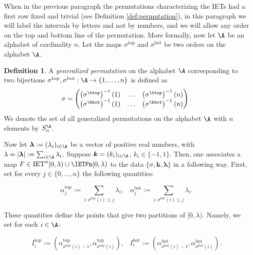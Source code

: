 \documentclass[12pt]{article}
\theoremstyle{definition}
\newtheorem{definition}{Definition}
\begin{document}
When in the previous paragraph the permutations characterizing the IETs had a first row fixed and trivial (see Definition \ref{def:permutation}), in this paragraph we will label the intervals by letters and not by numbers, and we will allow any order on the top and bottom line of the permutation. More formally, now let $\A$ be an alphabet of cardinality $n$. Let the maps $\sigma^{\mathrm{top}}$ and $\sigma^{\mathrm{bot}}$ be two orders on the alphabet $\A$. 

\begin{definition}
A \emph{generalized permutation} on the alphabet $\A$ corresponding to two bijections $\sigma^{\mathrm{top}}, \sigma^{\mathrm{bot}}: \A \rightarrow \{1, \ldots, n\}$ is 
defined as
\begin{equation}\label{eq:matrix_representation_gen_permutation}
\sigma=\begin{pmatrix}
\left(\sigma^{\ttop}\right)^{-1}(1)&\ldots&\left(\sigma^{\ttop}\right)^{-1}(n) \\
\left(\sigma^{\bbot}\right)^{-1}(1)&\ldots&\left(\sigma^{\bbot}\right)^{-1}(n) 
\end{pmatrix}.
\end{equation}
We denote the set of all generalized permutations on the alphabet $\A$ with $n$ elements by $S_n^{\A}$.
\end{definition}

Now let $\boldsymbol{\lambda}:=(\lambda_i)_{i \in \A}$ be a vector of positive real numbers, with $\lambda=|\boldsymbol{\lambda}|:=\sum_{i \in \A} \lambda_i$. Suppose $\boldsymbol{k}=(k_i)_{i \in \A}$, $k_i \in \{-1,1\}$. Then, one associates a map $F \in \mathrm{IET}^n [0, \lambda) \cup \IETFn [0, \lambda) $ to the data $\{\sigma, \textbf{k}, \boldsymbol{\lambda}\}$ in a following way. First, set for every $j \in \{0, \ldots, n\}$ the following quantities:

\begin{equation*}
\alpha_j^{\mathrm{top}}:=\sum_{i: \sigma^{\mathrm{top}}(i) \leq j} \lambda_i, \;\;\; \alpha_j^{\mathrm{bot}}:=\sum_{i: \sigma^{\mathrm{bot}}(i) \leq j} \lambda_i.
\end{equation*}

These quantities define the points that give two partitions of $[0, \lambda)$. Namely, we set for each $i \in \A$: 

\begin{equation*}
I_i^{\mathrm{top}}:=\left(
 \alpha^{\mathrm{top}}_{\sigma^{\mathrm{top}}(i)-1}, \alpha^{\mathrm{top}}_{\sigma^{\mathrm{top}}(i)} 
 \right), \;\;\; I_i^{\mathrm{bot}}:=\left(
 \alpha^{\mathrm{bot}}_{\sigma^{\mathrm{bot}}(i)-1}, \alpha^{\mathrm{bot}}_{\sigma^{\mathrm{bot}}(i)} 
 \right).
\end{equation*}
\end{document}
